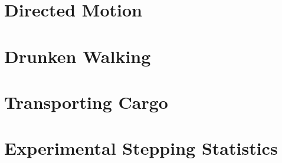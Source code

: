 \section{Directed Motion}
\section{Drunken Walking}
\section{Transporting Cargo}
\section{Experimental Stepping Statistics}